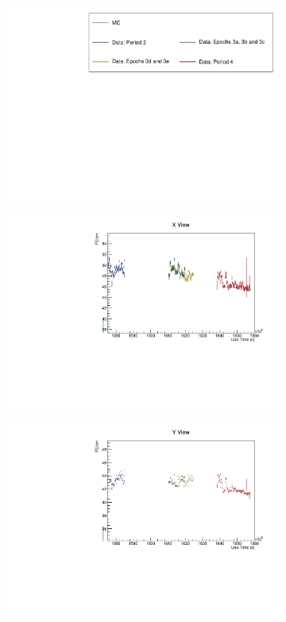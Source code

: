 \documentclass[12pt,a4paper]{article}
\begin{document}
\begin{figure}[h!]
  \begin{subfigure}{\textwidth}
    \centering
    \includegraphics[height=0.2\linewidth]{essentialsec_tb/legend.pdf}
  \end{subfigure}
  \vspace*{2mm}
  
  \begin{subfigure}{0.5\textwidth}
    \includegraphics[width=\linewidth]{driftsec_tb/pecm_time_x.pdf}
  \end{subfigure}
  \begin{subfigure}{0.5\textwidth}
    \includegraphics[width=\linewidth]{driftsec_tb/pecm_time_y.pdf}

\end{subfigure}
\end{figure}
\end{document}
